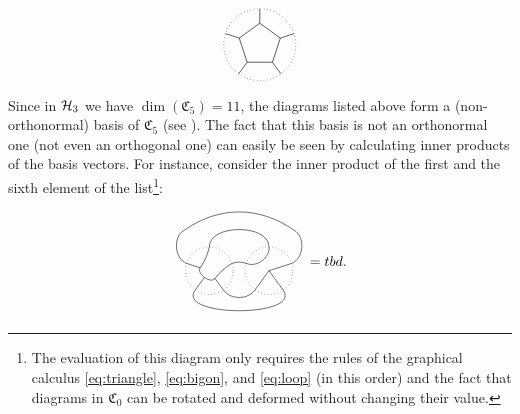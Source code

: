 		\begin{equation}
			\begin{tikzpicture}[scale=0.9]
				\rotatebox{18}{
				\draw[dotted] (0,0) circle(1cm);
				\draw (0:0.6cm) -- (72:0.6cm) -- (144:0.6cm) -- (216:0.6cm) -- (288:0.6cm) -- cycle;
				\draw (0:0.6cm) -- (0:1cm);
				\draw (72:0.6cm) -- (72:1cm);
				\draw (144:0.6cm) -- (144:1cm);
				\draw (216:0.6cm) -- (216:1cm);
				\draw (288:0.6cm) -- (288:1cm);}
			\end{tikzpicture}
		\end{equation}
	Since in ${\mathcal{H}_3}$ we have $\dim(\mathfrak{C}_5)=11$, the diagrams listed above form a (non-orthonormal) basis of $\mathfrak{C}_5$ (see \cite[Proposition 7.5]{Morrison2017}). The fact that this basis is not an orthonormal one (not even an orthogonal one) can easily be seen by calculating inner products of the basis vectors. For instance, consider the inner product of the first and the sixth element of the list\footnote{The evaluation of this diagram only requires the rules of the graphical calculus \cref{eq:triangle}, \cref{eq:bigon}, and \cref{eq:loop} (in this order) and the fact that diagrams in $\mathfrak{C}_0$ can be rotated and deformed without changing their value.}:
		\begin{equation}
			\begin{tikzpicture}[scale=0.6,baseline={([yshift=-3pt]current bounding box.center)}]
			\draw[dotted] (0,0) circle(1cm);
			\draw (90:1cm) to [bend left=10] (162:0.4cm);
			\draw (18:1cm) to [bend right=10] (306:0.4cm);
			\draw (162:0.4cm) to [bend right=90] (306:0.4cm);
			\draw (306:0.4cm) -- (306:1cm);
			\draw (162:0.4cm) -- (162:1cm);
			\draw (234:0.35cm) -- (234:1cm);
			\draw (306:1cm) to [bend right=54] ([xshift=2.5cm]234:1cm);
			\draw (234:1cm) to [bend right=126] ([xshift=2.5cm]306:1cm);
			\draw (18:1cm) to [bend left=18] ([xshift=2.5cm]162:1cm);
			\draw (90:1cm) to [bend left=90] ([xshift=2.5cm]90:1cm);
			\draw (122:2cm) to [bend left=35] ([xshift=2.5cm]58:2cm);
			\draw (162:1cm) to [bend left=65] (122:2cm);
			\draw ([xshift=2.5cm]18:1cm) to [bend right=65] ([xshift=2.5cm]58:2cm);
			\begin{scope}[shift={(2.5,0)}]
				\draw[dotted] (0,0) circle(1cm);
				\draw (90:1cm) to [bend left=60] (162:1cm);
				\draw (234:1cm) -- (0,0);
				\draw (306:1cm) -- (0,0);
				\draw (18:1cm) -- (0,0);
			\end{scope}
			\end{tikzpicture}=t b d.
		\end{equation}
	
